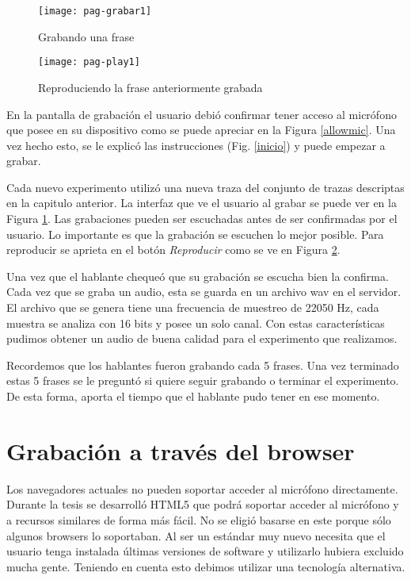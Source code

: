 \begin{figure}[h!]
    \centerline{\texttt{[image: pag-grabar1]} }
    \caption{Grabando una frase}
    \label{grabando}
\end{figure}

\begin{figure}[h!]
    \centerline{\texttt{[image: pag-play1]} }
    \caption{Reproduciendo la frase anteriormente grabada}
    \label{reproduciendo}
\end{figure}

En la pantalla de grabación el usuario debió confirmar tener acceso al micrófono que posee en su dispositivo como se puede apreciar en la Figura \ref{allowmic}. Una vez hecho esto, se le explicó las instrucciones (Fig. \ref{inicio}) y puede empezar a grabar. 

Cada nuevo experimento utilizó una nueva traza del conjunto de trazas descriptas en la capitulo anterior. La interfaz que ve el usuario al grabar se puede ver en la Figura \ref{grabando}. Las grabaciones pueden ser escuchadas antes de ser confirmadas por el usuario. Lo importante es que la grabación se escuchen lo mejor posible. Para reproducir se aprieta en el botón \textit{Reproducir} como se ve en Figura \ref{reproduciendo}. 

Una vez que el hablante chequeó que su grabación se escucha bien la confirma. Cada vez que se graba un audio, esta se guarda en un archivo wav en el servidor. El archivo que se genera tiene una frecuencia de muestreo de 22050 Hz, cada muestra se analiza con 16 bits y posee un solo canal. Con estas características pudimos obtener un audio de buena calidad para el experimento que realizamos.

Recordemos que los hablantes fueron grabando cada 5 frases. Una vez terminado estas 5 frases se le preguntó si quiere seguir grabando o terminar el experimento. De esta forma, aporta el tiempo que el hablante pudo tener en ese momento.

\section{Grabación a través del browser}

Los navegadores actuales no pueden soportar acceder al micrófono directamente. Durante la tesis se desarrolló HTML5 que podrá soportar acceder al micrófono y a recursos similares de forma más fácil. No se eligió basarse en este porque sólo algunos browsers lo soportaban. Al ser un estándar muy nuevo necesita que el usuario tenga instalada últimas versiones de software y utilizarlo hubiera excluido mucha gente. Teniendo en cuenta esto debimos utilizar una tecnología alternativa. 

